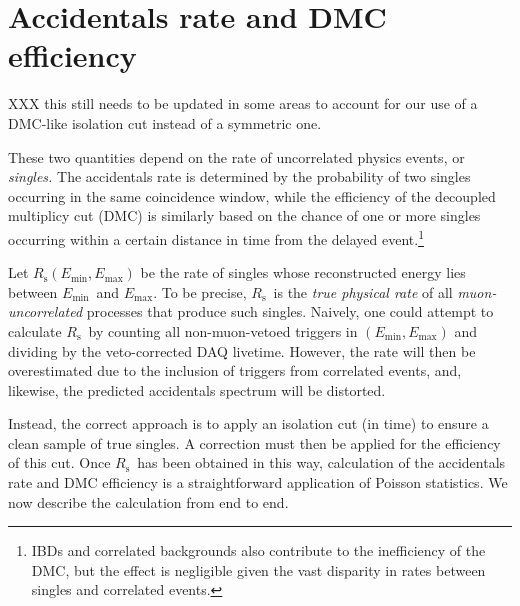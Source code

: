 \documentclass[../thesis.tex]{subfiles}
\begin{document}
\chapter{Accidentals rate and DMC efficiency}
\label{chap:accDMC}

XXX this still needs to be updated in some areas to account for our use of a DMC-like isolation cut instead of a symmetric one. 

\def\Emin{\ensuremath{E_\mathrm{min}}} \def\Emax{\ensuremath{E_\mathrm{max}}}
\def\Rs{\ensuremath{R_\mathrm{s}}} \def\Rplu{\ensuremath{R_\mathrm{+}}}
\def\Rpro{\ensuremath{R_\mathrm{p}}} \def\Rdel{\ensuremath{R_\mathrm{d}}}
\def\Rsub{\ensuremath{R_\mathrm{\lambda}}} \def\Nplu{\ensuremath{N_\mathrm{+}}}
\def\Npro{\ensuremath{N_\mathrm{p}}} \def\Ndel{\ensuremath{N_\mathrm{d}}}
\def\eisol{\ensuremath{\epsilon_\mathrm{i}}}
\def\emu{\ensuremath{\epsilon_\mathrm{\mu}}}
\def\etot{\ensuremath{\epsilon_\mathrm{tot}}}
\def\Racc{\ensuremath{R_\mathrm{acc}}}

These two quantities depend on the rate of uncorrelated physics events, or
\emph{singles.} The accidentals rate is determined by the probability of two
singles occurring in the same coincidence window, while the efficiency of the
decoupled multiplicy cut (DMC) is similarly based on the chance of one or more
singles occurring within a certain distance in time from the delayed
event.\footnote{IBDs and correlated backgrounds also contribute to the
  inefficiency of the DMC, but the effect is negligible given the vast disparity
  in rates between singles and correlated events.}

Let $\Rs(\Emin, \Emax)$ be the rate of singles whose reconstructed energy lies
between \Emin\ and \Emax. To be precise, \Rs\ is the \emph{true physical rate}
of all \emph{muon-uncorrelated} processes that produce such singles. Naively,
one could attempt to calculate \Rs\ by counting all non-muon-vetoed triggers in
$(\Emin, \Emax)$ and dividing by the veto-corrected DAQ livetime. However, the
rate will then be overestimated due to the inclusion of triggers from correlated
events, and, likewise, the predicted accidentals spectrum will be distorted.

Instead, the correct approach is to apply an isolation cut (in time) to ensure a
clean sample of true singles. A correction must then be applied for the
efficiency of this cut. Once \Rs\ has been obtained in this way, calculation of
the accidentals rate and DMC efficiency is a straightforward application of
Poisson statistics. We now describe the calculation from end to end.
\end{document}
